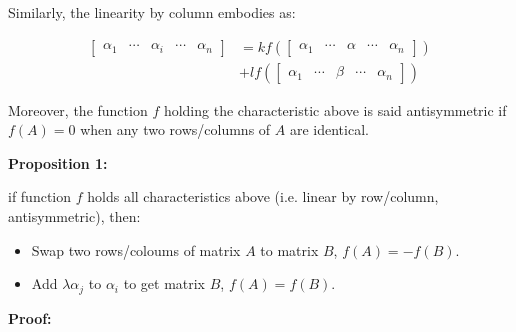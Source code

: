 \documentclass{article}
\begin{document}
Similarly, the linearity by column embodies as:

\begin{equation}
\begin{split}
\begin{bmatrix}
    \alpha_1 &
    \cdots &
    \alpha_i &
    \cdots &
    \alpha_n
\end{bmatrix} & =
kf(
\begin{bmatrix}
    \alpha_1 &
    \cdots &
    \alpha &
    \cdots &
    \alpha_n
\end{bmatrix}) \\
& + lf(
\begin{bmatrix}
    \alpha_1 &
    \cdots &
    \beta &
    \cdots &
    \alpha_n
\end{bmatrix}
)
\end{split}
\end{equation}

Moreover, the function \(f\) holding the characteristic above is
said antisymmetric if
\(f(A)=0\) when any two rows/columns of \(A\) are identical. 

\vspace{2mm}
\textbf{Proposition 1:}

if function \(f\) holds all characteristics above (i.e. linear
by row/column, antisymmetric), then:

\begin{itemize}
    \item Swap two rows/coloums of matrix \(A\) to matrix \(B\),
    \(f(A)=-f(B)\).
    \item Add \(\lambda\alpha_j\) to \(\alpha_i\) to get matrix \(B\),
    \(f(A)=f(B)\).
\end{itemize}

\vspace{2mm}
\textbf{Proof:}
\end{document}
